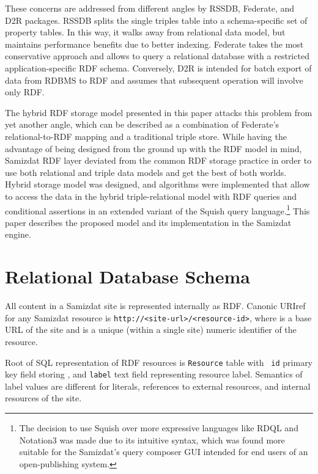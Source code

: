 \documentclass{llncs}
\begin{document}
These concerns are addressed from different angles by RSSDB\cite{rssdb},
Federate\cite{ericp-rdf-rdb-access}, and D2R\cite{d2r} packages. RSSDB splits
the single triples table into a schema-specific set of property tables. In
this way, it walks away from relational data model, but maintains performance
benefits due to better indexing. Federate takes the most conservative approach
and allows to query a relational database with a restricted
application-specific RDF schema. Conversely, D2R is intended for batch export
of data from RDBMS to RDF and assumes that subsequent operation will involve
only RDF.

The hybrid RDF storage model presented in this paper attacks this problem from
yet another angle, which can be described as a combination of Federate's
relational-to-RDF mapping and a traditional triple store. While having the
advantage of being designed from the ground up with the RDF model in mind,
Samizdat RDF layer\cite{samizdat-rdf-storage} deviated from the common RDF
storage practice in order to use both relational and triple data models and
get the best of both worlds. Hybrid storage model was designed, and algorithms
were implemented that allow to access the data in the hybrid triple-relational
model with RDF queries and conditional assertions in an extended variant of
the Squish\cite{squish} query language.\footnote{The decision to use Squish
over more expressive languages like RDQL\cite{rdql} and
Notation3\cite{notation3} was made due to its intuitive syntax, which was
found more suitable for the Samizdat's query composer GUI intended for end
users of an open-publishing system.} This paper describes the proposed model
and its implementation in the Samizdat engine.


\section{Relational Database Schema}

All content in a Samizdat site is represented internally as RDF. Canonic
URIref for any Samizdat resource is {\tt http://<site-url>/<resource-id>},
where {\tt <site-url>} is a base URL of the site and {\tt <resource-id>} is a
unique (within a single site) numeric identifier of the resource.

Root of SQL representation of RDF resources is {\tt Resource} table with {\tt
id} primary key field storing {\tt <resource-id>}, and {\tt label} text field
representing resource label. Semantics of label values are different for
literals, references to external resources, and internal resources of the
site.
\end{document}
